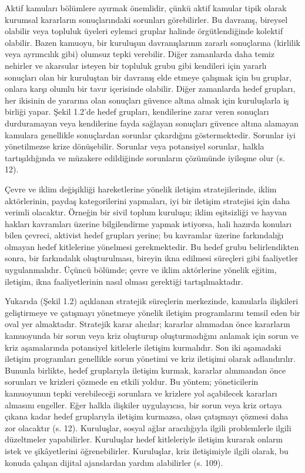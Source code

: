 \documentclass[
]{book}
\begin{document}
Aktif kamuları bölümlere ayırmak önemlidir, çünkü aktif kamular tipik olarak kurumsal kararların sonuçlarındaki sorunları görebilirler. Bu davranış, bireysel olabilir veya topluluk üyeleri eylemci gruplar halinde örgütlendiğinde kolektif olabilir. Bazen kamuoyu, bir kuruluşun davranışlarının zararlı sonuçlarına (kirlilik veya ayrımcılık gibi) olumsuz tepki verebilir. Diğer zamanlarda daha temiz nehirler ve akarsular isteyen bir topluluk grubu gibi kendileri için yararlı sonuçları olan bir kuruluştan bir davranış elde etmeye çalışmak için bu gruplar, onlara karşı olumlu bir tavır içerisinde olabilir. Diğer zamanlarda hedef grupları, her ikisinin de yararına olan sonuçları güvence altına almak için kuruluşlarla iş birliği yapar. Şekil 1.2'de hedef grupları, kendilerine zarar veren sonuçları durduramayan veya kendilerine fayda sağlayan sonuçları güvence altına alamayan kamulara genellikle sonuçlardan sorunlar çıkardığını göstermektedir. Sorunlar iyi yönetilmezse krize dönüşebilir. Sorunlar veya potansiyel sorunlar, halkla tartışıldığında ve müzakere edildiğinde sorunların çözümünde iyileşme olur (s. 12). \citep{grunig2009paradigms}

Çevre ve iklim değişikliği hareketlerine yönelik iletişim stratejilerinde, iklim aktörlerinin, paydaş kategorilerini yapmaları, iyi bir iletişim stratejisi için daha verimli olacaktır. Örneğin bir sivil toplum kuruluşu; iklim eşitsizliği ve hayvan hakları kavramları üzerine bilgilendirme yapmak istiyorsa, hali hazırda konuları bilen çevreci, aktivist hedef grupları yerine; bu kavramlar üzerine farkındalığı olmayan hedef kitlelerine yönelmesi gerekmektedir. Bu hedef grubu belirlendikten sonra, bir farkındalık oluşturulması, bireyin ikna edilmesi süreçleri gibi faaliyetler uygulanmalıdır. Üçüncü bölümde; çevre ve iklim aktörlerine yönelik eğitim, iletişim, ikna faaliyetlerinin nasıl olması gerektiği tartışılmaktadır.

Yukarıda (Şekil 1.2) açıklanan stratejik süreçlerin merkezinde, kamularla ilişkileri geliştirmeye ve çatışmayı yönetmeye yönelik iletişim programlarını temsil eden bir oval yer almaktadır. Stratejik karar alıcılar; kararlar alınmadan önce kararların kamuoyunda bir sorun veya kriz oluşturup oluşturmadığını anlamak için sorun ve kriz aşamalarında potansiyel kitlelerle iletişim kurmalıdır. Son iki aşamadaki iletişim programları genellikle sorun yönetimi ve kriz iletişimi olarak adlandırılır. Bununla birlikte, hedef gruplarıyla iletişim kurmak, kararlar alınmandan önce sorunları ve krizleri çözmede en etkili yoldur. Bu yöntem; yöneticilerin kamuoyunun tepki verebileceği sorunlara ve krizlere yol açabilecek kararları almasını engeller. Eğer halkla ilişkiler uygulayıcısı, bir sorun veya kriz ortaya çıkana kadar hedef gruplarıyla iletişim kurmazsa, olası çatışmayı çözmesi daha zor olacaktır (s. 12). \citep{grunig2009paradigms} Kuruluşlar, sosyal ağlar aracılığıyla ilgili problemlerle ilgili düzeltmeler yapabilirler. Kuruluşlar hedef kitleleriyle iletişim kurarak onların istek ve şikâyetlerini öğrenebilirler. Kuruluşlar, kriz iletişimiyle ilgili olarak, bu konuda çalışan dijital ajanslardan yardım alabilirler (s. 109). \citep{gucdemir2015sanal}
\end{document}
